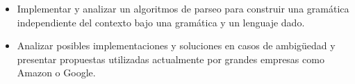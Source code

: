 \begin{itemize}
    \item Implementar y analizar un algoritmos de parseo para construir una gramática independiente del contexto bajo una gramática y un lenguaje dado.
    \item Analizar posibles implementaciones y soluciones en casos de ambigüedad y presentar propuestas utilizadas actualmente por grandes empresas como Amazon o Google.
\end{itemize}